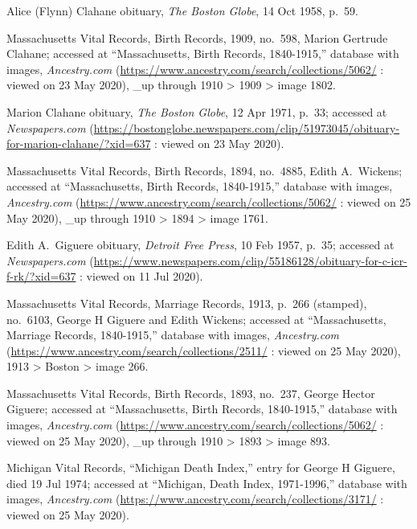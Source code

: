 \begin{thebibliography}{999}
Alice (Flynn) Clahane obituary, \textit{The Boston Globe}, 14 Oct 1958, p.\ 59.

Massachusetts Vital Records, Birth Records, 1909, no.\ 598, Marion Gertrude Clahane; accessed at ``Massachusetts, Birth Records, 1840-1915,'' database with images, \textit{Ancestry.com} (\url{https://www.ancestry.com/search/collections/5062/} : viewed on 23 May 2020), \_up through 1910 > 1909 > image 1802.

Marion Clahane obituary, \textit{The Boston Globe}, 12 Apr 1971, p.\ 33; accessed at \textit{Newspapers.com} (\url{https://bostonglobe.newspapers.com/clip/51973045/obituary-for-marion-clahane/?xid=637} : viewed on 23 May 2020).


Massachusetts Vital Records, Birth Records, 1894, no.\ 4885, Edith A.\ Wickens; accessed at ``Massachusetts, Birth Records, 1840-1915,'' database with images, \textit{Ancestry.com} (\url{https://www.ancestry.com/search/collections/5062/} : viewed on 25 May 2020), \_up through 1910 > 1894 > image 1761.

Edith A.\ Giguere obituary, \textit{Detroit Free Press}, 10 Feb 1957, p.\ 35; accessed at \textit{Newspapers.com} (\url{https://www.newspapers.com/clip/55186128/obituary-for-c-icr-f-rk/?xid=637} : viewed on 11 Jul 2020).

Massachusetts Vital Records, Marriage Records, 1913, p.\ 266 (stamped), no.\ 6103, George H Giguere and Edith Wickens; accessed at ``Massachusetts, Marriage Records, 1840-1915,'' database with images, \textit{Ancestry.com} (\url{https://www.ancestry.com/search/collections/2511/} : viewed on 25 May 2020), 1913 > Boston > image 266.

Massachusetts Vital Records, Birth Records, 1893, no.\  237, George Hector Giguere; accessed at ``Massachusetts, Birth Records, 1840-1915,'' database with images, \textit{Ancestry.com} (\url{https://www.ancestry.com/search/collections/5062/} : viewed on 25 May 2020), \_up through 1910 > 1893 > image 893.

Michigan Vital Records, ``Michigan Death Index,'' entry for George H Giguere, died 19 Jul 1974; accessed at ``Michigan, Death Index, 1971-1996,'' database with images, \textit{Ancestry.com} (\url{https://www.ancestry.com/search/collections/3171/} : viewed on 25 May 2020).


\end{thebibliography}
